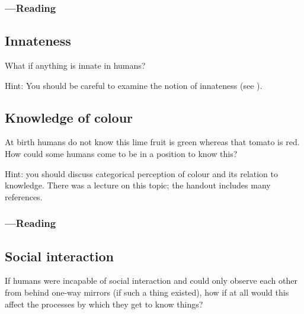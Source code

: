 \documentclass[12pt,\papersize]{extarticle}
\begin{document}
\subsubsection{---Reading}





\subsection{Innateness}
What if anything is innate in humans?

Hint: You should be careful to examine the notion of innateness  (see ).




\subsection{Knowledge of colour}
At birth humans do not know this lime fruit is green whereas that tomato is red.
How could some humans come to be in a position to know this?

Hint: you should discuss categorical perception of colour and its relation to knowledge.  There was a lecture on this topic; the handout includes many references.

\subsubsection{---Reading}









\subsection{Social interaction}
If humans were incapable of social interaction and could only observe each other from behind one-way mirrors (if such a thing existed), how if at all would this affect the processes by which they get to know things?
\end{document}
